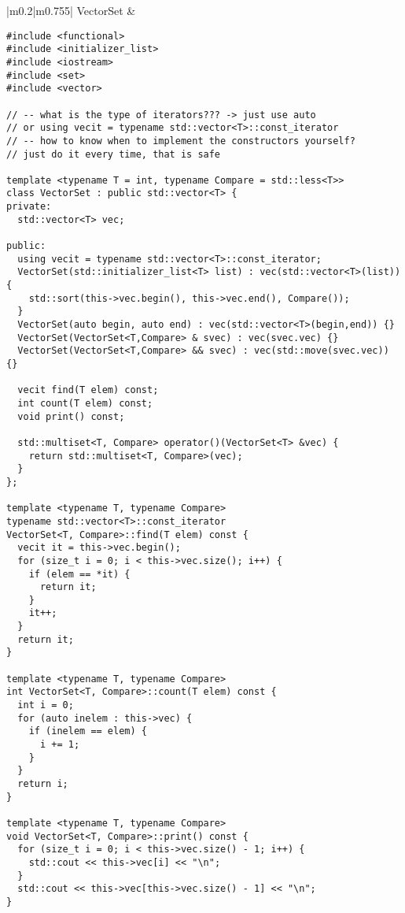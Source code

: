 \documentclass[main.tex,fontsize=8pt,paper=a4,paper=portrait,DIV=calc,]{scrartcl}
\begin{document}
\begin{table}[ht!]
\begin{tabular}{|m{0.2\linewidth}|m{0.755\linewidth}|}
\hline
VectorSet & 
\vspace{2mm}
\begin{lstlisting}
#include <functional>
#include <initializer_list>
#include <iostream>
#include <set>
#include <vector>

// -- what is the type of iterators??? -> just use auto
// or using vecit = typename std::vector<T>::const_iterator
// -- how to know when to implement the constructors yourself?
// just do it every time, that is safe

template <typename T = int, typename Compare = std::less<T>>
class VectorSet : public std::vector<T> {
private:
  std::vector<T> vec;

public:
  using vecit = typename std::vector<T>::const_iterator;
  VectorSet(std::initializer_list<T> list) : vec(std::vector<T>(list)) {
    std::sort(this->vec.begin(), this->vec.end(), Compare());
  }
  VectorSet(auto begin, auto end) : vec(std::vector<T>(begin,end)) {}
  VectorSet(VectorSet<T,Compare> & svec) : vec(svec.vec) {}
  VectorSet(VectorSet<T,Compare> && svec) : vec(std::move(svec.vec)) {}

  vecit find(T elem) const;
  int count(T elem) const;
  void print() const;

  std::multiset<T, Compare> operator()(VectorSet<T> &vec) {
    return std::multiset<T, Compare>(vec);
  }
};

template <typename T, typename Compare>
typename std::vector<T>::const_iterator
VectorSet<T, Compare>::find(T elem) const {
  vecit it = this->vec.begin();
  for (size_t i = 0; i < this->vec.size(); i++) {
    if (elem == *it) {
      return it;
    }
    it++;
  }
  return it;
}

template <typename T, typename Compare>
int VectorSet<T, Compare>::count(T elem) const {
  int i = 0;
  for (auto inelem : this->vec) {
    if (inelem == elem) {
      i += 1;
    }
  }
  return i;
}

template <typename T, typename Compare>
void VectorSet<T, Compare>::print() const {
  for (size_t i = 0; i < this->vec.size() - 1; i++) {
    std::cout << this->vec[i] << "\n";
  }
  std::cout << this->vec[this->vec.size() - 1] << "\n";
}
\end{lstlisting}
\\
\hline
\end{tabular}
\end{table}
\end{document}
